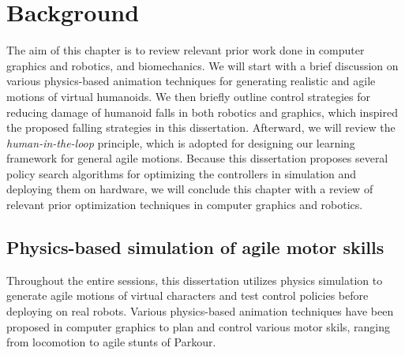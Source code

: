 \chapter{Background}

The aim of this chapter is to review relevant prior work done in
computer graphics and robotics, and biomechanics. 
We will start with a brief discussion on various physics-based animation
techniques for generating realistic and agile motions of virtual humanoids. 
We then briefly outline control strategies for reducing damage of humanoid
falls in both robotics and graphics, which inspired the proposed falling 
strategies in this dissertation. 
Afterward, we will review the \emph{human-in-the-loop} principle, which is
adopted for designing our learning framework for general agile motions. 
Because this dissertation proposes several policy search algorithms for
optimizing the controllers in simulation and deploying them on hardware, we
will conclude this chapter with a review of relevant prior optimization
techniques in computer graphics and robotics.

\section{Physics-based simulation of agile motor skills}
\label{sec:related_dynamic}

Throughout the entire sessions, this dissertation utilizes physics
simulation to generate agile motions of virtual characters and test control
policies before deploying on real robots.
Various physics-based animation techniques have been proposed in computer
graphics to plan and control various motor skils, ranging from locomotion to
agile stunts of Parkour.

